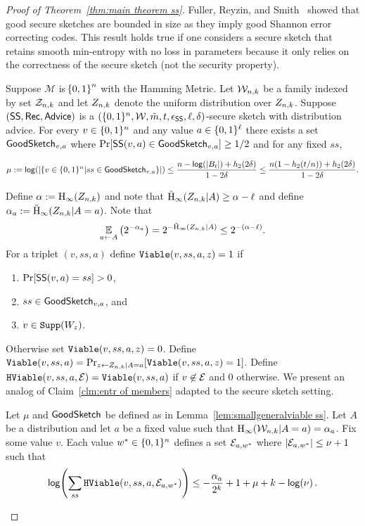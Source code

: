 \begin{proof}[Proof of Theorem~\ref{thm:main theorem ss}]

Fuller, Reyzin, and Smith~\cite[Lemma 7.3]{fuller2020fuzzy} showed that good secure sketches are bounded in size as they imply good Shannon error correcting codes.  This result holds true if one considers a secure sketch that retains smooth min-entropy with no loss in parameters because it only relies on the correctness of the secure sketch (not the security property).  

\begin{lemma}
\label{lem:smallgeneralviable ss}
    Suppose $\mathcal{M}$ is $\!\left\{ 0,1 \right\}^{n}$ with the Hamming Metric. Let $\mathcal{W}_{n,k}$ be a family indexed by set $\mathcal{Z}_{n,k}$ and let $Z_{n,k}$ denote the uniform distribution over $Z_{n,k}$.  Suppose $({\mathsf{SS}}, {\mathsf{Rec}}, {\mathsf{Advice}})$ is a $(\{0, 1\}^n, \mathcal{W}, \tilde{m}, t, \epsilon_{\mathsf{SS}}, \ell, \delta)$-secure sketch with distribution advice. 
   For every $v\in \{0, 1\}^n$ and any value $a \in \{0, 1\}^\ell$ there exists a set $\mathsf{GoodSketch}_{v,a}$ where $\Pr[{\mathsf{SS}}(v, a)\in \mathsf{GoodSketch}_{v,a}] \ge 1/2$ and for any fixed $ss$,
    
    \[
   \mu:= \mathsf{log}\!\left(|\{v \in \{0, 1\}^n | ss \in \mathsf{GoodSketch}_{v,a}\}|\right) \le \frac{n - \mathsf{log}\!\left(|B_t|\right) +h_2(2\delta)}{1-2\delta} \le \frac{n(1-h_2(t/n)) +h_2(2\delta)}{1-2\delta}.
    \]
\end{lemma}

\noindent
Define $\alpha :=\mathrm{H}_\infty(Z_{n,k})$ and note that $\tilde{\mathrm{H}}_\infty(Z_{n,k}|A)\ge \alpha-\ell$ and define $\alpha_a:=\tilde{\mathrm{H}}_\infty(Z_{n,k}|A=a)$.
 Note that \[\operatorname*{\mathbb{E}}_{a\leftarrow A} \left(2^{-\alpha_a} \right) =2^{-\tilde{\mathrm{H}}_\infty(Z_{n,k}|A)}\le 2^{-(\alpha-\ell)}.\] 
For a triplet $(v, ss, a)$ define $\mathtt{Viable}(v, ss, a, z)=1$ if 
\begin{enumerate}
\item $\Pr[{\mathsf{SS}}(v, a) = ss]>0$,
\item $ss\in\mathsf{GoodSketch}_{v,a}$, and 
\item $v\in\mathtt{Supp}(W_z)$.
\end{enumerate} Otherwise set $\mathtt{Viable}(v, ss, a, z)=0$.  Define $\mathtt{Viable}(v, ss, a) = \Pr_{z\leftarrow Z_{n,k}|A=a}[\mathtt{Viable}(v,ss,a,z)=1]$. Define $\mathtt{HViable}(v, ss, a, \mathcal{E}) = \mathtt{Viable}(v,ss, a)$ if $v\not\in \mathcal{E}$ and $0$ otherwise.
We present an analog of Claim~\ref{clm:entr of members} adapted to the secure sketch setting. 

\begin{claim}
Let $\mu$ and $\mathsf{GoodSketch}$ be defined as in Lemma~\ref{lem:smallgeneralviable ss}.
Let $A$ be a distribution and let $a$ be a fixed value such that $\mathrm{H}_\infty(\mathcal{W}_{n,k}|A=a) =\alpha_a$.  Fix some value $v$.  Each value $w^*\in\{0, 1\}^n$ defines a set $\mathcal{E}_{a, w^*}$ where $|\mathcal{E}_{a,w^*}| \le \nu+1$ such that
\begin{align*}
\mathsf{log}\!\left(\sum_{ss}\mathtt{HViable}(v,ss, a, \mathcal{E}_{a,w^*})\right)\le -\frac{\alpha_a}{2^k}+1+\mu+k-\mathsf{log}\!\left(\nu\right).
\end{align*}


\end{claim}
\end{proof}
